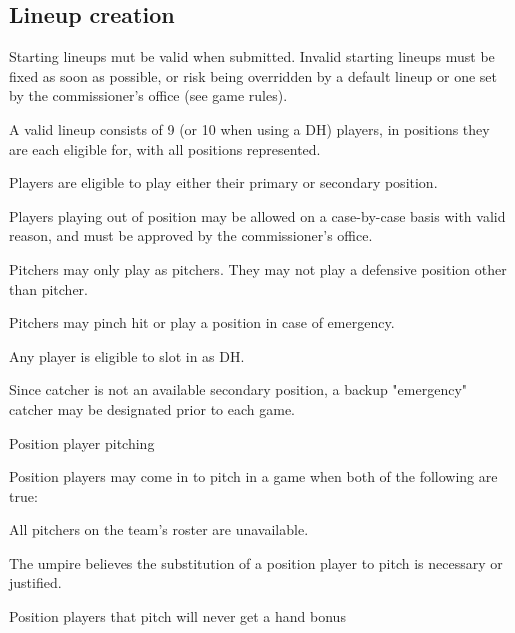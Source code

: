 \subsection{Lineup creation}
\begin{deepEnumerate}
	\item Starting lineups mut be valid when submitted.
	Invalid starting lineups must be fixed as soon as possible,
	or risk being overridden by a default lineup
	or one set by the commissioner’s office (see game rules). %
	\begin{deepEnumerate}
		\item A valid lineup consists of 9 (or 10 when using a DH) players,
		in positions they are each eligible for, with all positions represented.
		\begin{deepEnumerate}
			\item Players are eligible to play either their primary or secondary position.
			\item Players playing out of position may be allowed 
			on a case-by-case basis with valid reason,
			and must be approved by the commissioner’s office.
		\end{deepEnumerate}
		\item Pitchers may only play as pitchers.
		They may not play a defensive position other than pitcher.
		\begin{deepEnumerate}
			\item Pitchers may pinch hit or play a position in case of emergency.
		\end{deepEnumerate}
		\item Any player is eligible to slot in as DH.
		\item Since catcher is not an available secondary position,
		a backup "emergency" catcher may be designated prior to each game.
		\item Position player pitching
		\begin{deepEnumerate}
			\item Position players may come in to pitch in a game
			when both of the following are true:
			\begin{deepEnumerate}
				\item All pitchers on the team's roster are unavailable.
				\item The umpire believes the substitution 
				of a position player to pitch is necessary or justified.
			\end{deepEnumerate}
			\item Position players that pitch will never get a hand bonus

\end{deepEnumerate}
\end{deepEnumerate}
\end{deepEnumerate}
